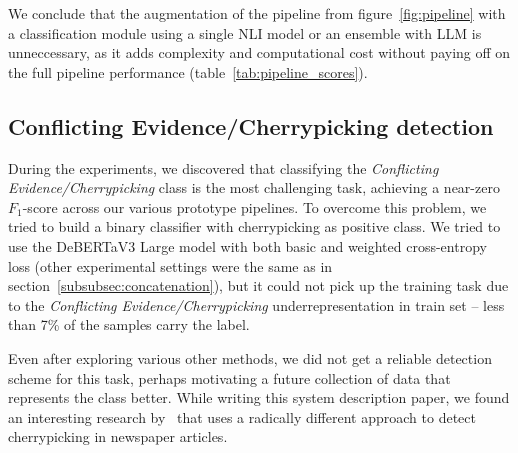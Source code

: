 We conclude that the augmentation of the pipeline from figure~\ref{fig:pipeline} with a classification module using a single NLI model or an ensemble with LLM is unneccessary, as it adds complexity and computational cost without paying off on the full pipeline performance (table~\ref{tab:pipeline_scores}).

\subsection{Conflicting Evidence/Cherrypicking detection}

During the experiments, we discovered that classifying the \textit{Conflicting Evidence/Cherrypicking} class is the most challenging task, achieving a near-zero $F_1$-score across our various prototype pipelines.
To overcome this problem, we tried to build a binary classifier with cherrypicking as positive class. We tried to use the DeBERTaV3 Large model with both basic and weighted cross-entropy loss (other experimental settings were the same as in section~\ref{subsubsec:concatenation}), but it could not pick up the training task due to the \textit{Conflicting Evidence/Cherrypicking} underrepresentation in train set -- less than 7\% of the samples carry the label. 

Even after exploring various other methods, we did not get a reliable detection scheme for this task, perhaps motivating a future collection of data that represents the class better.
While writing this system description paper, we found an interesting research by~\citet{jaradat2024contextawaredetectioncherrypickingnews} that uses a radically different approach to detect cherrypicking in newspaper articles.

